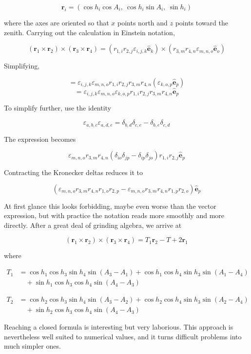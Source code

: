 \documentclass[11pt]{article}
\begin{document}
\begin{pproblem}
\begin{pssolution*}{}{}
    $$\mathbf r_i = (\cos h_i\cos A_i, \ \cos h_i\sin A_i, \ \sin h_i)$$

    where the axes are oriented so that $x$ points north and $z$ points toward the zenith. Carrying out the calculation in Einstein notation, 

    \[(\mathbf r_1 \times \mathbf r_2)\times(\mathbf r_3 \times \mathbf r_4) = (r_{1,i}r_{2,j}\varepsilon_{i,j,k}\mathbf{\hat{e}}_k)\times(r_{3,m}r_{4,n}\varepsilon_{m,n,o}\mathbf{\hat{e}}_o)\]

    Simplifying, 

    \[= \varepsilon_{i,j,k}\varepsilon_{m,n,o}r_{1,i}r_{2,j}r_{3,m}r_{4,n}(\varepsilon_{k,o,p}\mathbf{\hat{e}}_p)\]
    \[= \varepsilon_{i,j,k}\varepsilon_{m,n,o}\varepsilon_{k,o,p}r_{1,i}r_{2,j}r_{3,m}r_{4,n}\mathbf{\hat{e}}_p\]

    To simplify further, use the identity 

    \[\varepsilon_{a,b,c}\varepsilon_{a,d,e} = \delta_{b,d}\delta_{c,e}-\delta_{b,e}\delta_{c,d}\]

    The expression becomes 

    \[\varepsilon_{m,n,o}r_{3,m}r_{4,n}(\delta_{io}\delta_{jp}-\delta_{ip}\delta_{jo})r_{1,i}r_{2,j}\mathbf{\hat e}_p\]
    
    Contracting the Kronecker deltas reduces it to 

    \[(\varepsilon_{m,n,o}r_{3,m}r_{4,n}r_{1,o}r_{2,p}-\varepsilon_{m,n,o}r_{3,m}r_{4,n}r_{1,p}r_{2,o})\mathbf{\hat e}_p\]

    At first glance this looks forbidding, maybe even worse than the vector expression, but with practice the notation reads more smoothly and more directly. After a great deal of grinding algebra, we arrive at 

    \[\boxed{(\mathbf r_1 \times \mathbf r_2)\times(\mathbf r_3 \times \mathbf r_4) = T_1\mathbf r_2 - T+2\mathbf r_1}\]

    where

    \[
    \begin{aligned}
    T_1 &= 
    \cos h_1 \cos h_3 \sin h_4 \sin(A_3 - A_1)
    + \cos h_1 \cos h_4 \sin h_3 \sin(A_1 - A_4) \\
    &\quad + \sin h_1 \cos h_3 \cos h_4 \sin(A_4 - A_3)
    \end{aligned}
    \]

    \[
    \begin{aligned}
    T_2 &=
    \cos h_2 \cos h_3 \sin h_4 \sin(A_3 - A_2)
    + \cos h_2 \cos h_4 \sin h_3 \sin(A_2 - A_4) \\
    &\quad + \sin h_2 \cos h_3 \cos h_4 \sin(A_4 - A_3)
    \end{aligned}
    \]

    Reaching a closed formula is interesting but very laborious. This approach is nevertheless well suited to numerical values, and it turns difficult problems into much simpler ones.
\end{pssolution*}
\end{pproblem}
\end{document}
